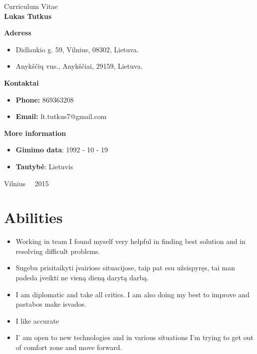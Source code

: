 \documentclass[a4paper,12pt]{article}
\begin{document}
\graphicspath{ {/} }

\renewcommand{\cftdot}{.}	
\renewcommand{\cftsecleader}{\cftdotfill{\cftdotsep}}

\thispagestyle{empty} %


\begin{center}
 Curriculum Vitae\\
\textbf{Lukas Tutkus} \\

\vspace{5cm}

\textbf{Aderess}
\begin{itemize}
	\item Didlaukio g. 59, Vilnius, 08302, Lietuva. 
	\item Anykščių vns., Anykščiai, 29159, Lietuva.
\end{itemize}

\textbf{Kontaktai}
\begin{itemize}
	\item \textbf{Phone:} 869363208
	\item \textbf{Email:} lt.tutkus7@gmail.com
\end{itemize}

\textbf{More information}
\begin{itemize}
	\item \textbf{Gimimo data}: 1992 - 10 - 19
	\item \textbf{Tautybė}: Lietuvis
\end{itemize}
\vfill

Vilnius \ \  2015
\end{center}



\clearpage

\section{Abilities}
\begin{itemize}
	\item Working in team I found myself very helpful in finding best solution and in resolving difficult problems.
	\item Sugebu prisitaikyti įvairiose situacijose, taip pat esu užsispyręs, tai man padeda įveikti ne vieną dieną darytą darbą.
	\item I am diplomatic and take all critics. I am also doing my best to improve and pastabos make isvados.
	\item I like accurate 
	\item I' am open to new technologies and in various situations I'm trying to get out of comfort zone and move forward.
\end{itemize}
\end{document}
